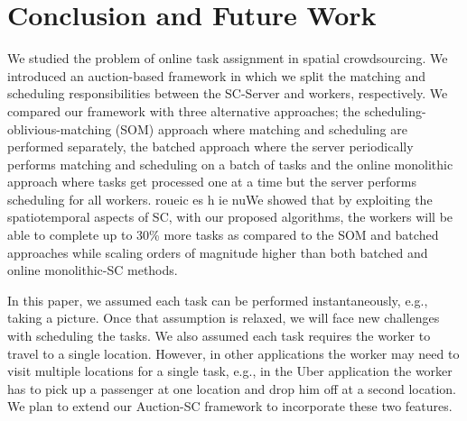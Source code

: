 \vspace{-0.1in}
\section{Conclusion and Future Work}
\label{sec:future}
\vspace{-0.1in}

We studied the problem of online task assignment in spatial crowdsourcing. We introduced an auction-based framework in which we split the matching and scheduling responsibilities between the SC-Server and workers, respectively. We compared our framework with three alternative approaches; the scheduling-oblivious-matching (SOM) approach where matching and scheduling are performed separately, the batched approach where the server periodically performs matching and scheduling on a batch of tasks and the online monolithic approach where tasks get processed one at a time but the server performs scheduling for all workers. roueic es h ie nuWe showed that by exploiting the spatiotemporal aspects of SC, with our proposed algorithms, the workers will be able to complete up to 30\% more tasks as compared to the SOM and batched approaches while scaling orders of magnitude higher than both batched and online monolithic-SC methods.

In this paper, we assumed each task can be performed instantaneously, e.g., taking a picture. Once that assumption is relaxed, we will face new challenges with scheduling the tasks. We also assumed each task requires the worker to travel to a single location. However, in other applications the worker may need to visit multiple locations for a single task, e.g., in the Uber application the worker has to pick up a passenger at one location and drop him off at a second location. We plan to extend our Auction-SC framework to incorporate these two features.